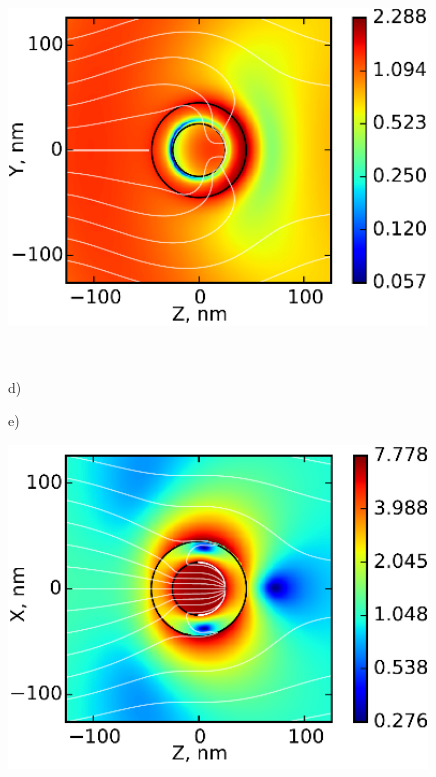 \documentclass[aip,jap,reprint]{revtex4-1}
\begin{document}
\begin{figure}[!h]
\begin{minipage}[h]{0.235\textwidth}
  \end{minipage}
  \hfill
  \begin{minipage}[h]{0.235\textwidth}
    \includegraphics[width=0.99\textwidth]{3c}
  \end{minipage}\\
  \vspace{4pt}
  \begin{minipage}[h]{0.235\textwidth}
    \begin{flushleft}
      d)
    \end{flushleft}
  \end{minipage}
  \hfill
  \begin{minipage}[h]{0.235\textwidth}
    \begin{flushleft}
      e)
    \end{flushleft}
  \end{minipage}
  \begin{minipage}[h]{0.235\textwidth}
    \includegraphics[width=0.99\textwidth]{3d}

\end{minipage}
\end{figure}
\end{document}
